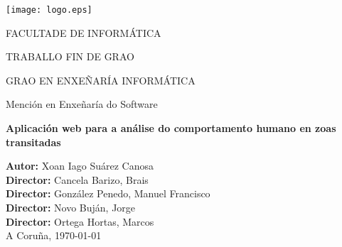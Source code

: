 \begin{titlepage}
\begin{center}

\texttt{[image: logo.eps]}

\vspace{0.5cm}
FACULTADE DE INFORMÁTICA

\vspace*{1cm}

\Large{TRABALLO FIN DE GRAO}

\Large{GRAO EN ENXEÑARÍA INFORMÁTICA}

Mención en Enxeñaría do Software

\vspace*{2cm}

\textbf{\LARGE{Aplicación web para a análise do comportamento humano en zoas transitadas}}

\end{center}

\vspace*{4cm}

\begin{flushright}
\large{
\textbf{Autor:} Xoan Iago Suárez Canosa\\
\textbf{Director:} Cancela Barizo, Brais \\
\textbf{Director:} González Penedo, Manuel Francisco \\
\textbf{Director:} Novo Buján, Jorge \\
\textbf{Director:} Ortega Hortas, Marcos \\
\vspace{0.5cm}
A Coruña, \today}
\end{flushright}

\end{titlepage}
